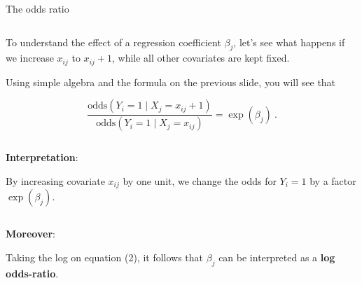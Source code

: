 \documentclass[10pt,ignorenonframetext,]{beamer}
\begin{document}
\begin{frame}

\begin{block}{The odds ratio}

\(~\)

To understand the effect of a regression coefficient \(\beta_j\), let's
see what happens if we increase \(x_{ij}\) to \(x_{ij}+1\), while all
other covariates are kept fixed.

\vspace{2mm}

Using simple algebra and the formula on the previous slide, you will see
that

\begin{equation}
\frac{\text{odds}(Y_i=1 \mid X_{j} = x_{ij} + 1)}{\text{odds}(Y_i=1 \mid X_j = x_{ij})} = \exp(\beta_j)  \ .
\end{equation}

\vspace{2mm}

\(~\)

\textbf{Interpretation}:

By increasing covariate \(x_{ij}\) by one unit, we change the odds for
\(Y_i=1\) by a factor \(\exp(\beta_j)\).

\(~\)

\textbf{Moreover}:

Taking the log on equation (2), it follows that \(\beta_j\) can be
interpreted as a \textbf{log odds-ratio}.

\end{block}

\end{frame}
\end{document}
